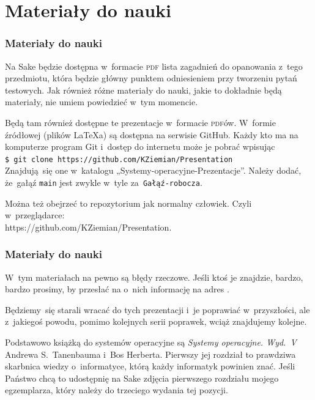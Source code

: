 \documentclass[10pt,t]{beamer}
\begin{document}
\section{Materiały do nauki}


\begin{frame}
  \frametitle{Materiały do nauki}


  Na Sake będzie dostępna w~formacie \textsc{pdf} \alert{lista zagadnień do
    opanowania z~tego przedmiotu}, która będzie główny punktem odniesieniem
  przy tworzeniu pytań testowych. Jak również różne materiały do nauki,
  jakie to dokładnie będą materiały, nie umiem powiedzieć w~tym momencie.

  Będą tam również dostępne te prezentacje w~formacie \textsc{pdf}ów.
  W~formie źródłowej (plików \LaTeX a) są dostępna na serwisie GitHub.
  Każdy kto ma na komputerze program Git i~dostęp do internetu może je
  pobrać wpisując \\
  \texttt{\$ git clone https://github.com/KZiemian/Presentation} \\
  Znajdują~się one w~katalogu „Systemy-operacyjne-Prezentacje”. Należy
  dodać, że~gałąź \texttt{main} jest zwykle w~tyle
  za~\texttt{Gałąź-robocza}.

  Można też obejrzeć to repozytorium jak normalny człowiek. Czyli
  w~przeglądarce: \\
  {https://github.com/KZiemian/Presentation}.

\end{frame}





\begin{frame}
  \frametitle{Materiały do nauki}


  W~tym materiałach na pewno są błędy rzeczowe. Jeśli ktoś je znajdzie,
  \alert{bardzo, bardzo prosimy}, by przesłać na o~nich informację na adres
  \email.

  Będziemy~się starali wracać do tych prezentacji i~je poprawiać
  w~przyszłości, ale z~jakiegoś powodu, pomimo kolejnych serii poprawek,
  wciąż znajdujemy kolejne.

  Podstawowo książką do systemów operacyjne są
  \textit{Systemy operacyjne. Wyd.~V} Andrewa S.~Tanenbauma i~Bos Herberta.
  Pierwszy jej rozdział to prawdziwa skarbnica wiedzy o~informatyce, którą
  każdy informatyk powinien znać. Jeśli Państwo chcą to udostępnię na Sake
  zdjęcia pierwszego rozdziału mojego egzemplarza, który należy do
  trzeciego wydania tej pozycji.

  \end{frame}
\end{document}

